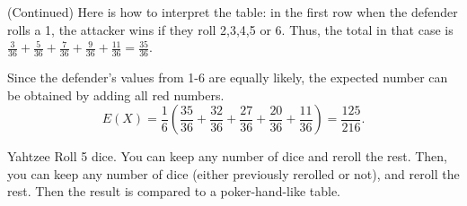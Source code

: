 \begin{frame}
\begin{sol} (Continued)
Here is how to interpret the table: in the first row when the defender rolls a 1, the attacker wins if they roll 2,3,4,5 or 6. Thus, the total in that case is $\frac{3}{36} + \frac{5}{36} + \frac{7}{36} + \frac{9}{36} + \frac{11}{36} = \frac{35}{36}$. 

\begin{figure}[h!]
\centering
{}
\end{figure}

Since the defender's values from 1-6 are equally likely, the expected number can be obtained by adding all red numbers. 
\[ E(X) = \frac{1}{6}\left(\frac{35}{36} + \frac{32}{36} + \frac{27}{36} + \frac{20}{36} + \frac{11}{36}\right) = \frac{125}{216}.\]
\end{sol}
\end{frame}

\begin{frame}{Yahtzee}
Roll 5 dice. You can keep any number of dice and reroll the rest. Then, you can keep any number of dice (either previously rerolled or not), and reroll the rest. Then the result is compared to a poker-hand-like table.
\end{frame}

\begin{frame}{}
\end{frame}

